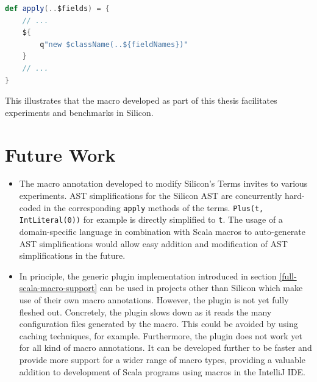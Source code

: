 \documentclass[11pt]{article}
\begin{document}
    \begin{lstlisting}[language=Scala, caption=Modified macro to ignore AST simplifications.]
def apply(..$fields) = {
    // ...
    ${
        q"new $className(..${fieldNames})"
    }
    // ...
}  
    \end{lstlisting}

    This illustrates that the macro developed as part of this thesis
    facilitates experiments and benchmarks in Silicon.



    \newpage
    \section{Future Work}

    \begin{itemize}
        \item The macro annotation developed to modify Silicon's Terms
            invites to various experiments. AST simplifications
            for the Silicon AST are concurrently hard-coded in the corresponding \texttt{apply}
            methods of the terms. \texttt{Plus(t, IntLiteral(0))} for example is directly
            simplified to \texttt{t}.
            The usage of a domain-specific language in combination with Scala macros to
            auto-generate AST
            simplifications would allow easy addition and modification
            of AST simplifications in the future. 
        \item In principle, the generic plugin implementation introduced in
            section \ref{full-scala-macro-support} can be used in projects other
            than Silicon which make use of their own macro annotations.
            However, the plugin is not yet fully fleshed out. Concretely,
            the plugin slows down as it reads the many configuration 
            files generated by the macro. This could be avoided by
            using caching techniques, for example. 
            Furthermore, the plugin does not work yet for
            all kind of macro annotations.
            It can be developed
            further to be faster and provide more support for a
            wider range of macro types, providing a valuable addition to
            development of Scala programs using macros in the IntelliJ IDE.
    \end{itemize}

    \newpage
\end{document}

